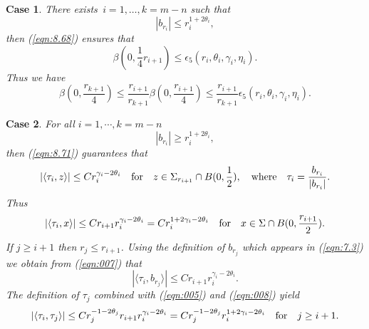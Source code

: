 \documentclass[12pt,leqno]{article}
\theoremstyle{plain}
\newtheorem{case}{Case}
\numberwithin{equation}{section}
\begin{document}
\begin{case}
There exists $\,i=1,\ldots, k=m-n$ such that
\begin{equation}\label{eqn:003}
|b_{r_i}|\le r_i^{1+2\theta_i},
\end{equation}
then (\ref{eqn:8.68}) ensures that
\begin{equation}\label{eqn:004}
\beta(0,\frac{1}{4}r_{i+1})\le {\epsilon_5(r_i, \theta_i,
\gamma_i, \eta_i)}.
\end{equation}
Thus we have
\begin{equation}\label{eqn:004A}
\beta(0,\frac{r_{k+1}}{4})\le \frac{r_{i+1}}{r_{k+1}}
\beta(0,\frac{r_{i+1}}{4})\le \frac{r_{i+1}}{r_{k+1}}
{\epsilon_5(r_i, \theta_i, \gamma_i, \eta_i)}.
\end{equation}
\end{case}



\begin{case}
For all $i=1,\cdots, k=m-n$
\begin{equation}\label{eqn:005}
|b_{r_i}|\ge r_i^{1+2\theta_i},
\end{equation}
then (\ref{eqn:8.71}) guarantees that
\begin{equation}\label{eqn:006}
|\langle\tau_i,z\rangle|\le C r^{\gamma_i-2\theta_i}_{i}\ \ \hbox{ for }\ \
z\in\Sigma_{r_{i+1}}\cap B(0,\frac{1}{2}),\ \ \hbox{ where }\ \
\tau_i=\frac{b_{r_i}}{|b_{r_i}|}.
\end{equation}
Thus
\begin{equation}\label{eqn:007}
|\langle\tau_i,x\rangle|\le Cr_{i+1} r^{\gamma_i-2\theta_i}_i =
Cr^{1+2\gamma_i-2\theta_i}_i
\ \ \hbox{ for }\ \
x\in\Sigma\cap B(0,\frac{r_{i+1}}{2}).
\end{equation}
If $j\ge i+1$ then $r_j\le r_{i+1}$. Using the definition of $b_{r_j}$ which
appears in (\ref{eqn:7.3}) we obtain from (\ref{eqn:007}) that
\begin{equation}\label{eqn:008}
|\langle\tau_i, b_{r_j}\rangle|\le C r_{i+1} r^{\gamma_i-2\theta_i}_i.
\end{equation}
The definition of $\tau_j$ combined with (\ref{eqn:005}) and (\ref{eqn:008})
yield
\begin{equation}\label{eqn:009}
|\langle\tau_i, \tau_{j}\rangle|\le C r^{-1-2\theta_j}_j
r_{i+1} r^{\gamma_i-2\theta_i}_i = C r^{-1-2\theta_j}_j
r^{1+2\gamma_i-2\theta_i}_i\ \ \hbox{ for }\ \ j\ge i+1.
\end{equation}
\end{case}
\end{document}
